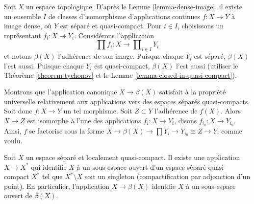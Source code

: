 \noindent
Soit $X$ un espace topologique. D'après le Lemme \ref{lemma-dense-image}, il
existe un ensemble $I$
de classes d'isomorphisme d'applications continues $f : X \to Y$ à image
dense, où $Y$ est séparé et quasi-compact. Pour $i \in I$, choisissons
un représentant $f_i : X \to Y_i$. Considérons l'application
$$
\prod f_i : X \longrightarrow \prod\nolimits_{i \in I} Y_i
$$
et notons $\beta(X)$ l'adhérence de son image. Puisque chaque $Y_i$ est
séparé, $\beta(X)$ l'est aussi. Puisque chaque $Y_i$ est quasi-compact,
$\beta(X)$ l'est aussi (utiliser le Théorème \ref{theorem-tychonov} et le
Lemme \ref{lemma-closed-in-quasi-compact}).

\medskip\noindent
Montrons que l'application canonique $X \to \beta(X)$ satisfait à la propriété
universelle relativement aux applications vers des espaces séparés
quasi-compacts. Soit donc $f : X \to Y$ un tel morphisme. Soit
$Z \subset Y$ l'adhérence de $f(X)$. Alors $X \to Z$ est isomorphe à l'une des
applications $f_i : X \to Y_i$, disons $f_{i_0} : X \to Y_{i_0}$. Ainsi, $f$
se factorise sous la forme
$X \to \beta(X) \to \prod Y_i \to Y_{i_0} \cong Z \to Y$, comme voulu.

\begin{lemma}
\label{lemma-one-point-compactification}
Soit $X$ un espace séparé et localement quasi-compact.
Il existe une application $X \to X^*$ qui identifie $X$ à un sous-espace
ouvert d'un espace séparé quasi-compact $X^*$ tel que
$X^* \setminus X$ soit un singleton (compactification par adjonction d'un point).
En particulier, l'application $X \to \beta(X)$ identifie $X$
à un sous-espace ouvert de $\beta(X)$.
\end{lemma}

